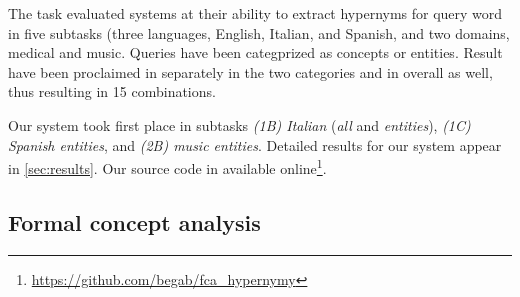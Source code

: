 \documentclass[11pt,a4paper]{article}
\begin{document}
The task \citep{Camacho-Collados:2018} evaluated systems at their ability to
extract hypernyms for query word in five subtasks (three languages, English,
Italian, and Spanish, and two domains, medical and music. Queries have been
categprized as concepts or entities. Result have been proclaimed in separately
in the two categories and in overall as well, thus resulting in 15
combinations.

  Our system took first place in subtasks
  \emph{(1B) Italian} (\emph{all} and \emph{entities}),
  \emph{(1C) Spanish entities}, and
  \emph{(2B) music entities}.
Detailed results for our system appear in \autoref{sec:results}.
Our source code in available
online\footnote{\url{https://github.com/begab/fca_hypernymy}}.


\subsection{Formal concept analysis}

\newcommand{\ob}{\ensuremath{\mathcal O}}
\newcommand{\at}{\ensuremath{\mathcal A}}
\newcommand{\inci}{\ensuremath{\mathcal I}}
\newcommand{\oaconc}{\ensuremath{\langle O, A\rangle}}
\end{document}
